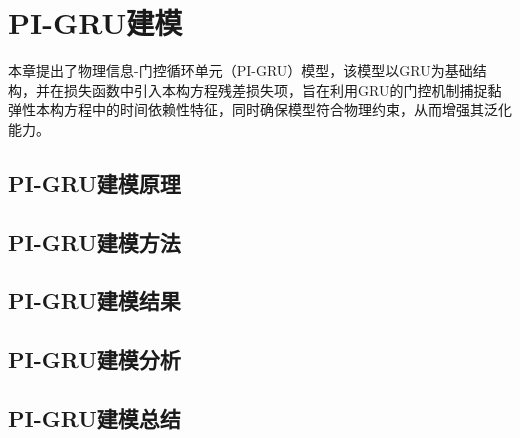 \chapter{PI-GRU建模}
本章提出了物理信息-门控循环单元（PI-GRU）模型，该模型以GRU为基础结构，并在损失函数中引入本构方程残差损失项，旨在利用GRU的门控机制捕捉黏弹性本构方程中的时间依赖性特征，同时确保模型符合物理约束，从而增强其泛化能力。
\section{PI-GRU建模原理}
\section{PI-GRU建模方法}
\section{PI-GRU建模结果}
\section{PI-GRU建模分析}
\section{PI-GRU建模总结}


